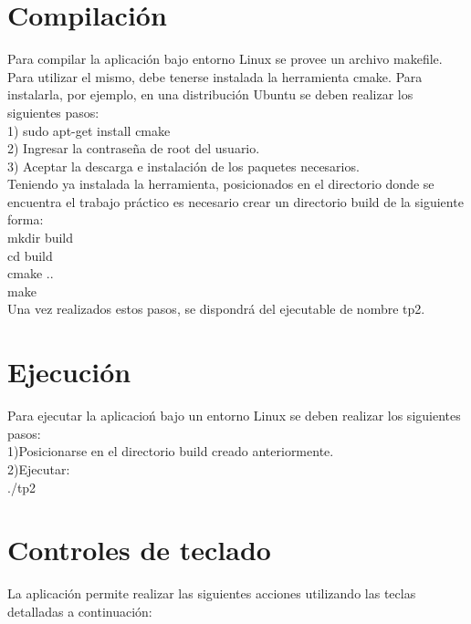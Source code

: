 \documentclass[11pt]{article}
\begin{document}
\newpage

\section{Compilaci\'on}
  Para compilar la aplicaci\'on bajo entorno Linux se provee un archivo makefile.
  Para utilizar el mismo, debe tenerse instalada la herramienta cmake. Para instalarla, por ejemplo, en una distribuci\'on Ubuntu se deben 
realizar los siguientes pasos: \\
1) sudo apt-get install cmake \\
2) Ingresar la contrase\~na de root del usuario. \\
3) Aceptar la descarga e instalaci\'on de los paquetes necesarios. \\ 

Teniendo ya instalada la herramienta, posicionados en el directorio donde se encuentra el trabajo pr\'actico es necesario crear un directorio build
de la siguiente forma: \\
mkdir build \\
cd build \\
cmake .. \\
make \\

Una vez realizados estos pasos, se dispondr\'a del ejecutable de nombre tp2.

\section{Ejecuci\'on}

Para ejecutar la aplicacio\'n bajo un entorno Linux se deben realizar los siguientes pasos: \\
1)Posicionarse en el directorio build creado anteriormente. \\
2)Ejecutar: \\
./tp2 

\newpage
\section{Controles de teclado}

La aplicaci\'on permite realizar las siguientes acciones utilizando las teclas detalladas a continuaci\'on: \\
\end{document}
